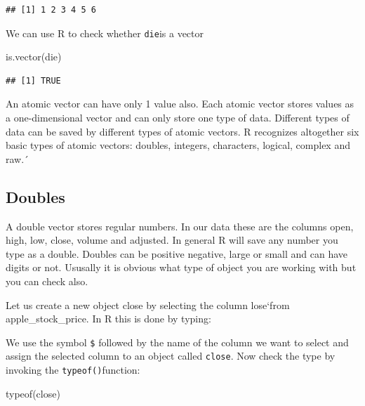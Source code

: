 \documentclass[
]{book}
\newenvironment{Shaded}{\begin{snugshade}}{\end{snugshade}}
\newcommand{\FunctionTok}[1]{\textcolor[rgb]{0.00,0.00,0.00}{#1}}
\newcommand{\NormalTok}[1]{#1}
\newcommand{\OtherTok}[1]{\textcolor[rgb]{0.56,0.35,0.01}{#1}}
\newcommand{\SpecialCharTok}[1]{\textcolor[rgb]{0.00,0.00,0.00}{#1}}
\begin{document}
\begin{verbatim}
## [1] 1 2 3 4 5 6
\end{verbatim}

We can use R to check whether \texttt{die}is a vector

\begin{Shaded}
\begin{Highlighting}[]
\FunctionTok{is.vector}\NormalTok{(die)}
\end{Highlighting}
\end{Shaded}

\begin{verbatim}
## [1] TRUE
\end{verbatim}

An atomic vector can have only 1 value also. Each atomic vector stores values as
a one-dimensional vector and can only store one type of data. Different types
of data can be saved by different types of atomic vectors. R recognizes
altogether six basic types of atomic vectors: doubles, integers, characters,
logical, complex and raw.´

\hypertarget{doubles}{%
\subsection{Doubles}\label{doubles}}

A double vector stores regular numbers. In our data these are the columns open, high, low,
close, volume and adjusted. In general R will save any number you type as a double. Doubles can
be positive negative, large or small and can have digits or not. Ususally it is obvious
what type of object you are working with but you can check also.

Let us create a new object close by selecting the column lose`from apple\_stock\_price. In R
this is done by typing:

\begin{Shaded}
\end{Shaded}

We use the symbol \texttt{\$} followed by the name of the column we want to select and assign the
selected column to an object called \texttt{close}. Now check the type by invoking the \texttt{typeof()}function:

\begin{Shaded}
\begin{Highlighting}[]
\FunctionTok{typeof}\NormalTok{(close)}
\end{Highlighting}
\end{Shaded}
\end{document}
